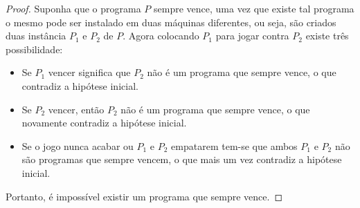 \begin{exem}
	\begin{proof}
		Suponha que o programa $P$  sempre vence, uma vez que existe tal programa o mesmo pode ser instalado em duas máquinas diferentes, ou seja, são criados duas instância $P_1$ e $P_2$ de $P$. Agora colocando $P_1$ para jogar contra $P_2$ existe três possibilidade:
		\begin{itemize}
			\item Se $P_1$ vencer significa que $P_2$ não é um programa que sempre vence, o que contradiz a hipótese inicial.
			\item Se $P_2$ vencer, então $P_2$ não é um programa que sempre vence, o que novamente contradiz a hipótese inicial.
			\item Se o jogo nunca acabar ou $P_1$ e $P_2$ empatarem tem-se que ambos $P_1$ e $P_2$ não são programas que sempre vencem, o que mais um vez contradiz a hipótese inicial.
		\end{itemize}
		Portanto, é impossível existir um programa que sempre vence.
	\end{proof}
\end{exem} 

